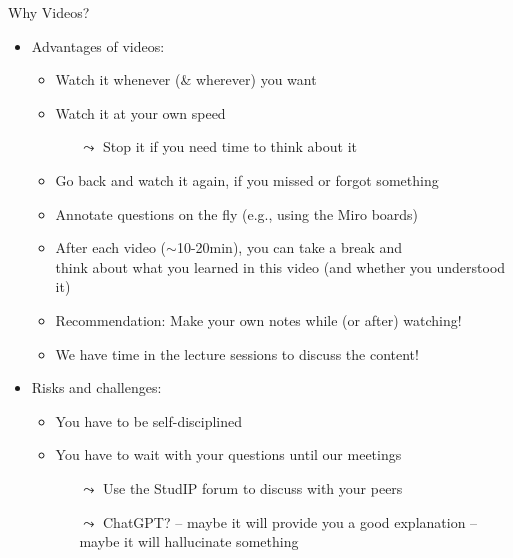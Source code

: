 \documentclass[aspectratio=169,handout]{../latex_main/tntbeamer}  %
\begin{document}
\begin{frame}[c]{Why Videos?}


\begin{itemize}
  \item Advantages of videos:
  \begin{itemize}
      \item Watch it whenever (\& wherever) you want
      \item Watch it at your own speed
      \begin{itemize}
          \item[$\leadsto$] Stop it if you need time to think about it
      \end{itemize}
      \item Go back and watch it again, if you missed or forgot something
      \item Annotate questions on the fly (e.g., using the Miro boards)
      \item After each video ($\sim$10-20min), you can take a break and\\ think about what you learned in this video (and whether you understood it)
      \item \alert{Recommendation:} Make your own notes while (or after) watching!
      \pause
      \item \alert{We have time in the lecture sessions to discuss the content!}
  \end{itemize}
  \medskip
  \pause
  \item Risks and challenges:
  \begin{itemize}
      \item You have to be self-disciplined 
      \item You have to wait with your questions until our meetings
      \begin{itemize}
          \item[$\leadsto$] Use the StudIP forum to discuss with your peers
          \item[$\leadsto$] ChatGPT? -- \alert{maybe} it will provide you a good explanation -- maybe it will hallucinate something
      \end{itemize}
  \end{itemize}
\end{itemize}

\end{frame}
\end{document}
